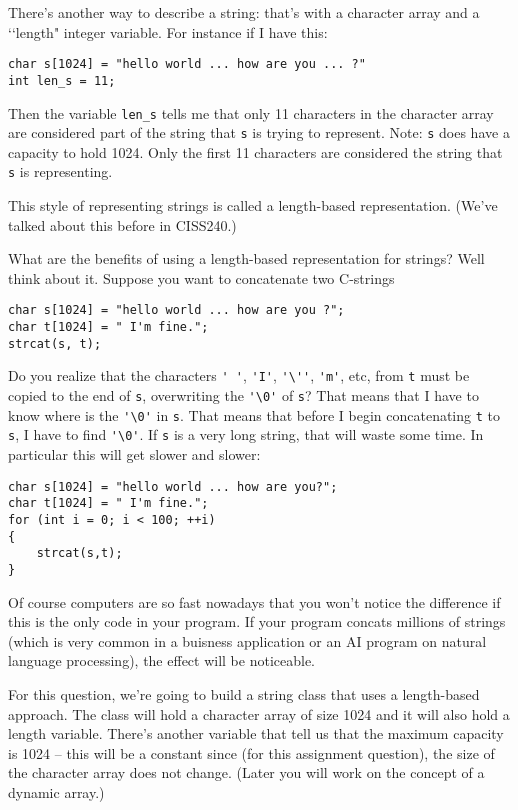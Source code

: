 There's another way to describe a string: that's with a character array and
a \lq\lq length" integer variable.
For instance if I have this:
{\small
\begin{Verbatim}[frame=single, commandchars= \~\@\!]
char s[1024] = "hello world ... how are you ... ?"
int len_s = 11;
\end{Verbatim}
}
Then the variable \verb!len_s! tells me that only 11 characters in the
character array are considered part of the
string that \verb!s! is trying to represent. Note: \verb!s! does have a
capacity to hold 1024. Only the first 11
characters are considered the string that \verb!s! is representing.

This style of representing strings is called a length-based representation.
(We've talked about this before
in CISS240.)

What are the benefits of using a length-based representation for strings?
Well think about it. Suppose
you want to concatenate two C-strings
{\small
\begin{Verbatim}[frame=single, commandchars = \~\@\!]
char s[1024] = "hello world ... how are you ?";
char t[1024] = " I'm fine.";
strcat(s, t);
\end{Verbatim}
}

Do you realize that the characters \verb!' '!, \verb!'I'!, \verb!'\''!,
\verb!'m'!, etc, from \verb!t! must be copied to the end of \verb!s!,
overwriting
the \verb!'\0'! of \verb!s!? That means that I have to know where is the
\verb!'\0'! in \verb!s!. That means that before I begin
concatenating \verb!t! to \verb!s!, I have to find \verb!'\0'!.
If \verb!s! is a very long string, that will waste some time.
In particular this will get slower and slower:
{\small
\begin{Verbatim}[frame=single, commandchars = \~\@\!]
char s[1024] = "hello world ... how are you?";
char t[1024] = " I'm fine.";
for (int i = 0; i < 100; ++i)
{
    strcat(s,t);
}
\end{Verbatim}
}
Of course computers are so fast nowadays that you won't notice the
difference if this is the only code
in your program. If your program concats millions of strings (which
is very common in a
buisness application or an AI program on natural language processing),
the effect will be noticeable.

For this question, we're going to build a string class that uses a
length-based approach. The class will
hold a character array of size 1024 and it will also hold a length variable.
There's another variable that
tell us that the maximum capacity is 1024 -- this will be a constant since
(for this assignment
question), the size of the character array does not change.
(Later you will work on the concept of a dynamic array.)

